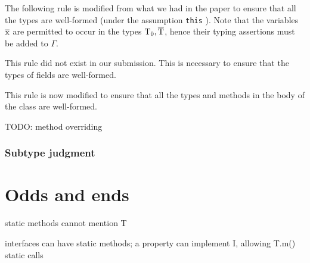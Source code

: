 \documentclass[preprint,nocopyrightspace,9pt]{sigplanconf}
\begin{document}
The following rule is modified from what we had in the paper to ensure
that all the types are well-formed (under the assumption {\tt this} ).
Note
that the variables $\xbar{x}$ are permitted to occur in the types $\Xcd{T}_0, \xbar{T}$,
hence their typing assertions must be added to $\Gamma$.



This rule did not exist in our submission. This is necessary to ensure
that the types of fields are well-formed.



This rule is now modified to ensure that all the types and methods in
the body of the class are well-formed.


TODO: method overriding


\subsubsection{
        Subtype judgment
}



\section{Odds and ends}

static methods cannot mention T

interfaces can have static methods; a property can implement I,
allowing T.m() static calls
\end{document}
